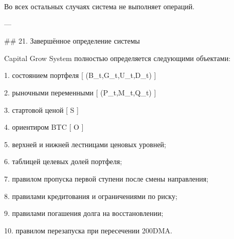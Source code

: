 Во всех остальных случаях система не выполняет операций.

---

## 21. Завершённое определение системы

Capital Grow System полностью определяется следующими объектами:

1. состоянием портфеля
   [
   (B_t,G_t,U_t,D_t)
   ]

2. рыночными переменными
   [
   (P_t,M_t,Q_t)
   ]

3. стартовой ценой
   [
   S
   ]

4. ориентиром BTC
   [
   O
   ]

5. верхней и нижней лестницами ценовых уровней;

6. таблицей целевых долей портфеля;

7. правилом пропуска первой ступени после смены направления;

8. правилами кредитования и ограничениями по риску;

9. правилами погашения долга на восстановлении;

10. правилом перезапуска при пересечении 200DMA.
